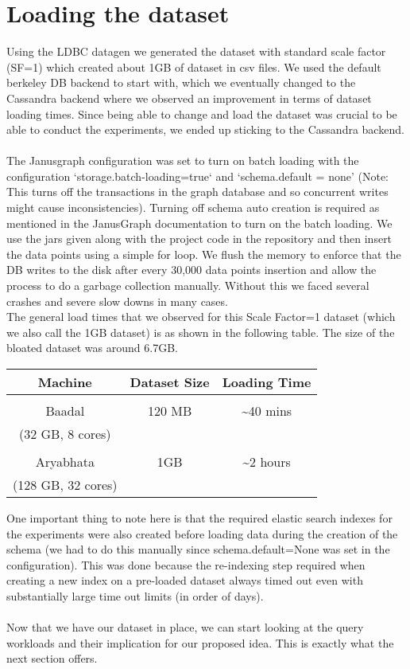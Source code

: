 \section{Loading the dataset}

Using the LDBC datagen \cite{datagen} we generated the dataset with standard scale factor (SF=1) which created about 1GB of dataset in csv files. We used the default berkeley DB backend to start with, which we eventually changed to the Cassandra backend where we observed an improvement in terms of dataset loading times. Since being able to change and load the dataset was crucial to be able to conduct the experiments, we ended up sticking to the Cassandra backend.
\\\\
The Janusgraph configuration was set to turn on batch loading with the configuration `storage.batch-loading=true` and `schema.default = none' (Note: This turns off the transactions in the graph database and so concurrent writes might cause inconsistencies). Turning off schema auto creation is required as mentioned in the JanusGraph documentation to turn on the batch loading. We use the jars given along with the project code in the repository and then insert the data points using a simple for loop. We flush the memory to enforce that the DB writes to the disk after every 30,000 data points insertion and allow the process to do a garbage collection manually. Without this we faced several crashes and severe slow downs in many cases.
\\
The general load times that we observed for this Scale Factor=1 dataset (which we also call the 1GB dataset) is as shown in the following table. The size of the bloated dataset was around 6.7GB.

\begin{center}
\begin{tabular}{|c|c|c|}
\hline
\textbf{Machine} & \textbf{Dataset Size} & \textbf{Loading Time} \\
\hline
& &\\
Baadal & 120 MB & \textasciitilde 40 mins \\
(32 GB, 8 cores) & & \\
\hline
& &\\
Aryabhata & 1GB & \textasciitilde 2 hours \\
(128 GB, 32 cores) & & \\
\hline
\end{tabular}
\end{center}
$\:$\\
One important thing to note here is that the required elastic search indexes for the experiments were also created before loading data during the creation of the schema (we had to do this manually since schema.default=None was set in the configuration). This was done because the re-indexing step required when creating a new index on a pre-loaded dataset always timed out even with substantially large time out limits (in order of days).\\
\\
Now that we have our dataset in place, we can start looking at the query workloads and their implication for our proposed idea. This is exactly what the next section offers.

